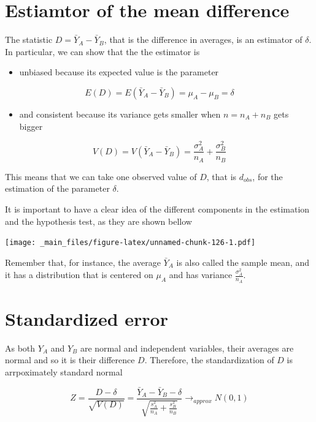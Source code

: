\documentclass[
]{book}
\providecommand{\tightlist}{%
  \setlength{\itemsep}{0pt}\setlength{\parskip}{0pt}}
\begin{document}
\hypertarget{estiamtor-of-the-mean-difference}{%
\section{Estiamtor of the mean difference}\label{estiamtor-of-the-mean-difference}}

The statistic \(D=\bar{Y}_A-\bar{Y}_B\), that is the difference in averages, is an estimator of \(\delta\). In particular, we can show that the the estimator is

\begin{itemize}
\tightlist
\item
  unbiased because its expected value is the parameter
\end{itemize}

\[E(D)=E(\bar{Y}_A-\bar{Y}_B)=\mu_A-\mu_B=\delta\]

\begin{itemize}
\tightlist
\item
  and consistent because its variance gets smaller when \(n=n_A+n_B\) gets bigger
\end{itemize}

\[V(D)=V(\bar{Y}_A-\bar{Y}_B)=\frac{\sigma^2_A}{n_A}+\frac{\sigma^2_B}{n_B}\]

This means that we can take one observed value of \(D\), that is \(d_{obs}\), for the estimation of the parameter \(\delta\).

It is important to have a clear idea of the different components in the estimation and the hypothesis test, as they are shown bellow

\texttt{[image: \_main\_files/figure-latex/unnamed-chunk-126-1.pdf]}

Remember that, for instance, the average \(\bar{Y}_A\) is also called the sample mean, and it has a distribution that is centered on \(\mu_A\) and has variance \(\frac{\sigma_A^2}{n_A}\).

\hypertarget{standardized-error}{%
\section{Standardized error}\label{standardized-error}}

As both \(Y_A\) and \(Y_B\) are normal and independent variables, their averages are normal and so it is their difference \(D\). Therefore, the standardization of \(D\) is arrpoximately standard normal

\[Z=\frac{D-\delta}{\sqrt{V(D)}}=\frac{\bar{Y}_A-\bar{Y}_B -\delta}{\sqrt{\frac{s^2_A}{n_A}+\frac{s^2_B}{n_B}}} \rightarrow_{approx} N(0,1)\]
\end{document}

